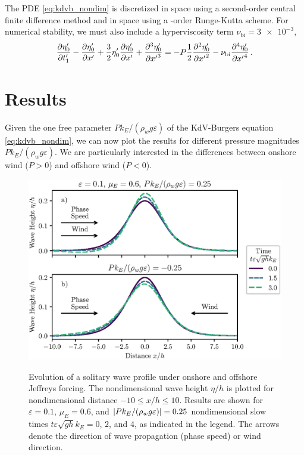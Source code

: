 \documentclass{jfm}
\renewcommand*{\epsilon}{\varepsilon}
\begin{document}
The PDE \cref{eq:kdvb_nondim} is discretized in space using a
second-order central finite difference method and in space using a
-order Runge-Kutta scheme.
For numerical stability, we must also include a hyperviscosity term
$\nu_{\text{bi}} = \num{3e-3}$,
\begin{equation}
  \pdv{\eta'_0}{t'_1} - \pdv{\eta'_0}{x'} + \frac{3}{2}
  \eta'_0 \pdv{\eta'_0}{x'} + \pdv[3]{\eta'_0}{{x'}} =
  -P \frac{1}{2} \pdv[2]{\eta'_0}{{x'}} - \nu_{\text{bi}}
  \pdv[4]{\eta'_0}{{x'}} \,.
\end{equation}

\section{\label{sec:results} Results}
Given the one free parameter $P k_E/(\rho_w g \epsilon)$ of the
KdV-Burgers equation \cref{eq:kdvb_nondim}, we can now plot the results
for different pressure magnitudes $P k_E/(\rho_w g \epsilon)$.
We are particularly interested in the differences between onshore wind
($P > 0$) and offshore wind ($P < 0$).

\begin{figure}
  \centering
  { %
    \label{fig:snapshots_solitary:a}
    \label{fig:snapshots_solitary:b}
  }
  \includegraphics{Snapshots-Positive-Negative.eps}
  \caption{
    Evolution of a solitary wave profile under
    onshore and
    offshore Jeffreys forcing.
    The nondimensional wave height $\eta/h$ is plotted for
    nondimensional distance $-10 \le x/h \le 10$.
    Results are shown for $\epsilon=0.1$, $\mu_E = 0.6$, and $\abs{P
    k_E/(\rho_w g \epsilon)} = 0.25$ nondimensional slow times $t
    \epsilon \sqrt{gh} k_E = 0$, $2$, and $4$, as indicated in the
    legend.
    The arrows denote the direction of wave propagation (phase speed) or
    wind direction.
  }
  \label{fig:snapshots_solitary}
\end{figure}
\end{document}

